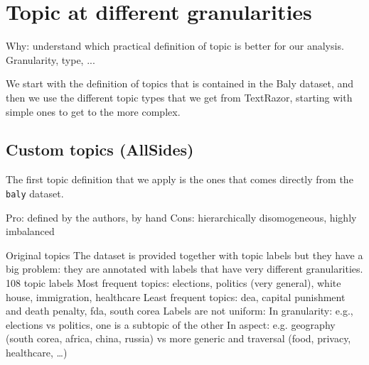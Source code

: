 




\section{Topic at different granularities}
\label{sec:topic_topic_granularities}
Why: understand which practical definition of topic is better for our analysis. Granularity, type, ...




We start with the definition of topics that is contained in the Baly dataset, and then we use the different topic types that we get from TextRazor, starting with simple ones to get to the more complex.

\subsection{Custom topics (AllSides)}

The first topic definition that we apply is the ones that comes directly from the \texttt{baly} dataset.

Pro: defined by the authors, by hand
Cons: hierarchically disomogeneous, highly imbalanced

Original topics
The dataset is provided together with topic labels but they have a big problem: they are annotated with labels that have very different granularities.
108 topic labels
Most frequent topics: elections, politics (very general), white house, immigration, healthcare
Least frequent topics: dea, capital punishment and death penalty, fda, south corea
Labels are not uniform:
In granularity: e.g., elections vs politics, one is a subtopic of the other
In aspect: e.g. geography (south corea, africa, china, russia) vs more generic and traversal (food, privacy, healthcare, …)

